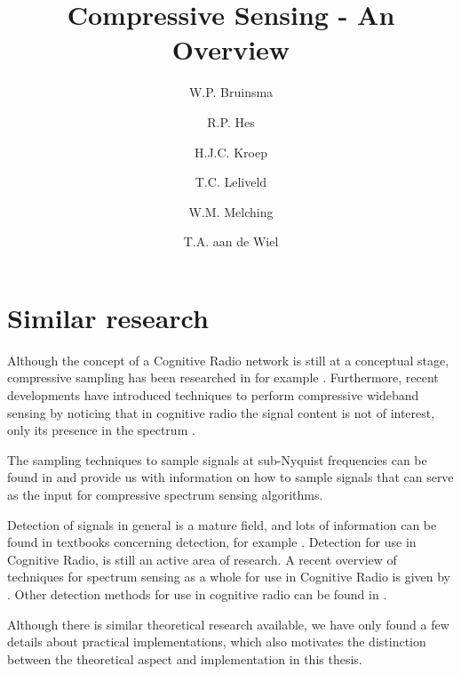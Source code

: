 \documentclass[a4paper, openany, oneside]{memoir}
\title{Compressive Sensing - An Overview}
\author{W.P. Bruinsma \and R.P. Hes \and H.J.C. Kroep \and T.C. Leliveld \and W.M. Melching \and T.A. aan de Wiel}
\begin{document}
\chapter{Similar research}

Although the concept of a Cognitive Radio network is still at a conceptual stage, compressive sampling has been researched in for example 
\cite{candes2007sparsity,candes2006robust,zhang2008theory,candes2008introduction}. Furthermore, recent developments have introduced techniques to perform compressive wideband sensing by noticing that in cognitive radio the signal content is not of interest, only its presence in the spectrum \cite{ariananda2012compressive,ariananda2014cooperative}. 

The sampling techniques to sample signals at sub-Nyquist frequencies can be found in \cite{pal2011coprime,ariananda2011multicoset,lexa2011multi} and provide us with information on how to sample signals that can serve as the input for compressive spectrum sensing algorithms.

Detection of signals in general is a mature field, and lots of information can be found in textbooks concerning detection, for example \cite{couch2013digital,kay1998fundamentals}. Detection for use in Cognitive Radio, is still an active area of research. A recent overview of techniques for spectrum sensing as a whole for use in Cognitive Radio is given by \cite{axell2012spectrum}. Other detection methods for use in cognitive radio can be found in \cite{han2013novel,zheng2009spectrum}.

Although there is similar theoretical research available, we have only found a few details about practical implementations, which also motivates the distinction between the theoretical aspect and implementation in this thesis.   
\end{document}
